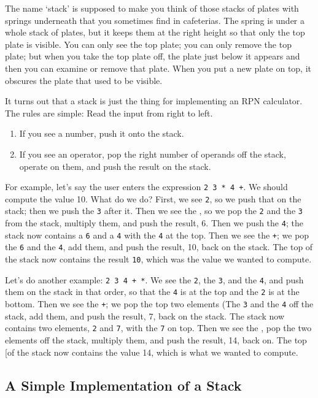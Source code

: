 The name `stack' is supposed to make you think of those stacks of plates
with springs underneath that you sometimes find in cafeterias.  The
spring is under a whole stack of plates, but it keeps them at the right
height so that only the top plate is visible.  You can only see the top
plate; you can only remove the top plate; but when you take the top
plate off, the plate just below it appears and then you can examine or
remove that plate.  When you put a new plate on top, it obscures the
plate that used to be visible.

It turns out that a stack is just  the thing for implementing an RPN
calculator.  The rules are simple:  Read the input from right to left. 
\begin{enumerate}
\item If you see a number, push it onto the stack.
\item If you see an operator, pop the right number of operands off the
stack, operate on them, and push the result on the stack.
\end{enumerate}

For example, let's say the user enters the expression {\tt 2 3 * 4 +}.
We should compute the value 10.  What do we do?  First, we see {\tt 2},
so we push that on the stack; then we push the {\tt 3} after it.  Then
we see the {\tt *}, so we pop the {\tt 2} and the {\tt 3} from the
stack, multiply them, and push the result, 6.  Then we push the {\tt 4};
the stack now contains a {\tt 6} and a {\tt 4} with the {\tt 4} at the
top.    Then we see the {\tt +}; we pop the {\tt 6} and the {\tt 4}, add
them, and push the result, 10, back on the stack.  The top of the stack
now contains the result {\tt 10}, which was the value we wanted to
compute.

Let's do another example:  {\tt 2 3 4 + *}.  We see the {\tt 2}, the
{\tt 3}, and the {\tt 4}, and push them on the stack in that order, so
that the {\tt 4} is at the top and the {\tt 2} is at the bottom.  Then
we see the {\tt +}; we pop the top two elements (The {\tt 3} and the
{\tt 4} off the stack, add them, and push the result, 7, back on the
stack.  The stack now contains two elements, {\tt 2} and {\tt 7}, with
the {\tt 7} on top.  Then we see the {\tt *}, pop the two elements off
the stack, multiply them, and push the result, 14, back on.  The top [of
the stack now contains the value 14, which is what we wanted to compute.

\subsection{A Simple Implementation of a Stack}

